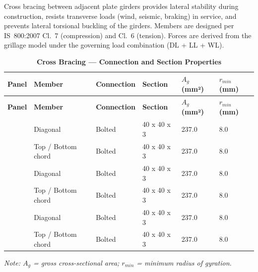 \documentclass[12pt,a4paper]{report}
\numberwithin{table}{chapter}
\numberwithin{figure}{chapter}
\begin{document}
Cross bracing between adjacent plate girders provides lateral stability during construction, resists transverse loads (wind, seismic, braking) in service, and prevents lateral torsional buckling of the girders. Members are designed per IS~800:2007 Cl.~7 (compression) and Cl.~6 (tension). Forces are derived from the grillage model under the governing load combination  (DL + LL + WL).

\vspace{1em}

\vspace{0.4em}
\noindent
\setlength{\tabcolsep}{3pt}
\setlength\LTleft{0pt}
\setlength\LTright{\fill}

\begin{longtable}{|C{2.0cm}|L{2.0cm}|L{2.2cm}|C{2.5cm}|C{2.0cm}|C{2.0cm}|}
\caption{\textbf{Cross Bracing --- Connection and Section Properties}}
\hline
\textbf{Panel} & \textbf{Member} & \textbf{Connection} & \textbf{Section} & \textbf{$A_g$ (mm²)} & \textbf{$r_{min}$ (mm)} \\[6pt]
\hline
\endfirsthead

\hline

\textbf{Panel} & \textbf{Member} & \textbf{Connection} & \textbf{Section} & \textbf{$A_g$ (mm²)} & \textbf{$r_{min}$ (mm)} \\[6pt]

\hline

\endhead
{} & Diagonal & Bolted & 40 x 40 x 3 & 237.0 & 8.0 \\[6pt]
 & Top / Bottom chord & Bolted & 40 x 40 x 3 & 237.0 & 8.0 \\[6pt]
\hline
{} & Diagonal & Bolted & 40 x 40 x 3 & 237.0 & 8.0 \\[6pt]
 & Top / Bottom chord & Bolted & 40 x 40 x 3 & 237.0 & 8.0 \\[6pt]
\hline
{} & Diagonal & Bolted & 40 x 40 x 3 & 237.0 & 8.0 \\[6pt]
 & Top / Bottom chord & Bolted & 40 x 40 x 3 & 237.0 & 8.0 \\[6pt]
\hline
\end{longtable}
\noindent\textit{Note: $A_g$ = gross cross-sectional area; $r_{min}$ = minimum radius of gyration.}
\end{document}

